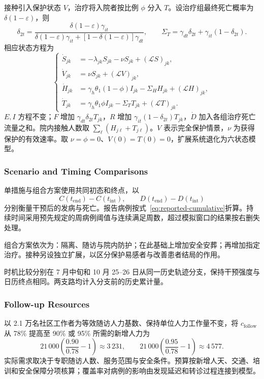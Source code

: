 接种引入保护状态 $V$，治疗将入院者按比例 $\phi$ 分入 $T$。设治疗组最终死亡概率为 $\delta(1-\varepsilon)$，则
\begin{equation}
\delta_{2t}=
\frac{\delta(1-\varepsilon)\gamma_{it}}
{\delta(1-\varepsilon)\gamma_{it}
+[1-\delta(1-\varepsilon)]\gamma_{dt}},\qquad
\Sigma_T=\gamma_{dt}\delta_{2t}+\gamma_{it}(1-\delta_{2t}).
\label{eq:therapy-probability}
\end{equation}
相应状态方程为
\begin{equation}
\left\{\begin{aligned}
\dot S_{jk}&=-\lambda_{jk}S_{jk}-\nu S_{jk}+(\mathcal{L}S)_{jk},\\
\dot V_{jk}&=\nu S_{jk}+(\mathcal{L}V)_{jk},\\
\dot H_{jk}&=\gamma_h\theta_1(1-\phi)I_{jk}
-\Sigma_H H_{jk}+(\mathcal{L}H)_{jk},\\
\dot T_{jk}&=\gamma_h\theta_1\phi I_{jk}
-\Sigma_T T_{jk}+(\mathcal{L}T)_{jk}.
\end{aligned}\right.
\label{eq:intervention-extension}
\end{equation}
$E,I$ 方程不变；$F$ 增加 $\gamma_{dt}\delta_{2t}T_{jk}$，$R$ 增加 $\gamma_{it}(1-\delta_{2t})T_{jk}$，$\dot D$ 加入各组治疗死亡流量之和。院内接触人数取 $\sum_\ell(H_{j\ell}+T_{j\ell})$。$V$ 表示完全保护情景，$\nu$ 为获得保护的有效速率。取 $\nu=\phi=0$、$V(0)=T(0)=0$，扩展系统退化为六状态模型。

\subsubsection{Scenario and Timing Comparisons}

单措施与组合方案使用共同初态和终点，以
\begin{equation}
C(t_{\mathrm{end}})-C(t_{\mathrm{int}}),\qquad
D(t_{\mathrm{end}})-D(t_{\mathrm{int}})
\label{eq:scenario-outcomes}
\end{equation}
分别衡量干预后的发病与死亡。报告病例按式~\eqref{eq:reported-cumulative}折算。持续时间采用预先规定的周病例阈值与连续满足周数，超过模拟窗口的结果按右删失处理。

组合方案依次为：隔离、随访与院内防护；在此基础上增加安全安葬；再增加指定治疗。接种另设独立扩展，以区分保护易感者与改善患者结局的作用。

时机比较分别在 7 月中旬和 10 月 25--26 日从同一历史轨迹分支，保持干预强度与日历终点相同。两支路均计入分支前的历史累计量。

\subsubsection{Follow-up Resources}

以 2.1 万名社区工作者为等效随访人力基数、保持单位人力工作量不变，将 $c_{\mathrm{follow}}$ 从 78\% 提高至 90\% 或 95\% 所需的新增人力为
\begin{equation}
21\,000\left(\frac{0.90}{0.78}-1\right)\approx3\,231,\qquad
21\,000\left(\frac{0.95}{0.78}-1\right)\approx4\,577.
\label{eq:followup-workforce}
\end{equation}
实际需求取决于专职随访人数、服务范围与安全条件。预算按新增人天、交通、培训和安全保障分项核算；覆盖率对病例的影响由发现延迟和转诊过程连接到模型。
